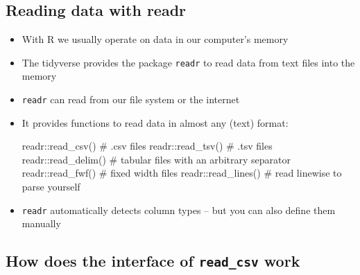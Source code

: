 \documentclass[
  letterpaper,
]{book}
\newenvironment{Shaded}{}{}
\newcommand{\CommentTok}[1]{\textcolor[rgb]{0.42,0.45,0.49}{#1}}
\newcommand{\FunctionTok}[1]{\textcolor[rgb]{0.44,0.26,0.76}{#1}}
\newcommand{\NormalTok}[1]{\textcolor[rgb]{0.14,0.16,0.18}{#1}}
\newcommand{\SpecialCharTok}[1]{\textcolor[rgb]{0.00,0.36,0.77}{#1}}
\begin{document}
\hypertarget{reading-data-with-readr}{%
\subsection{Reading data with readr}\label{reading-data-with-readr}}

\begin{itemize}
\item
  With R we usually operate on data in our computer's memory
\item
  The tidyverse provides the package \texttt{readr} to read data from
  text files into the memory
\item
  \texttt{readr} can read from our file system or the internet
\item
  It provides functions to read data in almost any (text) format:

\begin{Shaded}
\begin{Highlighting}[]
\NormalTok{readr}\SpecialCharTok{::}\FunctionTok{read\_csv}\NormalTok{()   }\CommentTok{\# .csv files}
\NormalTok{readr}\SpecialCharTok{::}\FunctionTok{read\_tsv}\NormalTok{()   }\CommentTok{\# .tsv files}
\NormalTok{readr}\SpecialCharTok{::}\FunctionTok{read\_delim}\NormalTok{() }\CommentTok{\# tabular files with an arbitrary separator}
\NormalTok{readr}\SpecialCharTok{::}\FunctionTok{read\_fwf}\NormalTok{()   }\CommentTok{\# fixed width files}
\NormalTok{readr}\SpecialCharTok{::}\FunctionTok{read\_lines}\NormalTok{() }\CommentTok{\# read linewise to parse yourself}
\end{Highlighting}
\end{Shaded}
\item
  \texttt{readr} automatically detects column types -- but you can also
  define them manually
\end{itemize}

\hypertarget{how-does-the-interface-of-read_csv-work}{%
\subsection{\texorpdfstring{How does the interface of \texttt{read\_csv}
work}{How does the interface of read\_csv work}}\label{how-does-the-interface-of-read_csv-work}}
\end{document}
